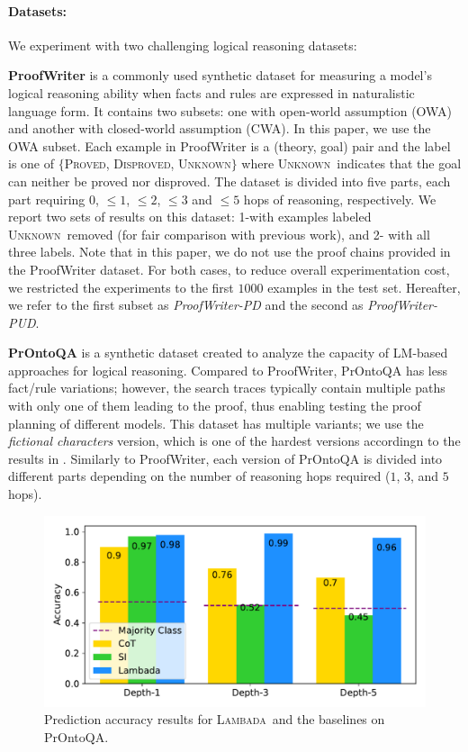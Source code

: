 \documentclass[11pt]{article}
\newcommand{\algo}{\textsc{Lambada}}
\newcommand{\proved}{\textsc{Proved}}
\newcommand{\disproved}{\textsc{Disproved}}
\newcommand{\unk}{\textsc{Unknown}}
\begin{document}
\paragraph{Datasets:}
We experiment with two challenging logical reasoning datasets:

\textbf{ProofWriter} \cite{tafjord2020proofwriter} is a commonly used synthetic dataset for measuring a model's logical reasoning ability when facts and rules are expressed in naturalistic language form. It contains two subsets: one with open-world assumption (OWA) and another with closed-world assumption (CWA). In this paper, we use the OWA subset. Each example in ProofWriter is a (theory, goal) pair and the label is one of $\{$\proved, \disproved, \unk$\}$ where \unk\ indicates that the goal can neither be proved nor disproved. The dataset is divided into five parts, each part requiring $0$, $\leq 1$, $\leq 2$, $\leq 3$ and $\leq 5$ hops of reasoning, respectively. We report two sets of results on this dataset: 1-with examples labeled \unk\ removed (for fair comparison with previous work), and 2- with all three labels. Note that in this paper, we do not use the proof chains provided in the ProofWriter dataset. For both cases, to reduce overall experimentation cost, we restricted the experiments to the first $1000$ examples in the test set. Hereafter, we refer to the first subset as \emph{ProofWriter-PD} and the second as \emph{ProofWriter-PUD}. 

\textbf{PrOntoQA} \cite{saparov2022language} is a synthetic dataset created to analyze the capacity of LM-based approaches for logical reasoning. Compared to ProofWriter, PrOntoQA has less fact/rule variations; however, the search traces typically contain multiple paths with only one of them leading to the proof, thus enabling testing the proof planning of different models. This dataset has multiple variants; we use the  \emph{fictional characters} version, which is one of the hardest versions accordingn to the results in \cite{saparov2022language}.
Similarly to ProofWriter, each version of PrOntoQA is divided into different parts depending on the number of reasoning hops required ($1$, $3$, and $5$ hops).

\begin{figure}[t]
  \centering
  \includegraphics[width=0.9\columnwidth]{prontoqa.pdf}
  \caption{%
  \label{fig:pronto} %
    Prediction accuracy results for \algo\ and the baselines on PrOntoQA.
  }
  \label{fig:pud}
\end{figure}
\end{document}

